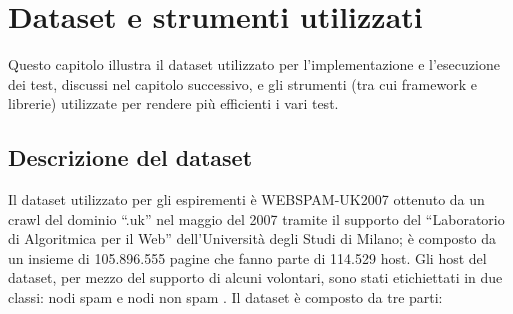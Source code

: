 \chapter{Dataset e strumenti utilizzati}
Questo capitolo illustra il dataset utilizzato per l'implementazione e l'esecuzione dei test,  discussi nel capitolo successivo, e gli strumenti (tra cui framework e librerie) utilizzate per rendere più efficienti i vari test.
\section{Descrizione del dataset}
Il dataset utilizzato per gli espirementi è WEBSPAM-UK2007 \cite{webspam-uk2007} ottenuto da un crawl del dominio ``.uk'' nel maggio del 2007 tramite il supporto del ``Laboratorio di Algoritmica per il Web'' dell'Università degli Studi di Milano; è composto da un insieme di 105.896.555 pagine che fanno parte di 114.529 host. Gli host del dataset, per mezzo del supporto  di alcuni volontari,  sono stati etichiettati in due classi: nodi spam e nodi non spam . Il dataset è composto da tre parti:
